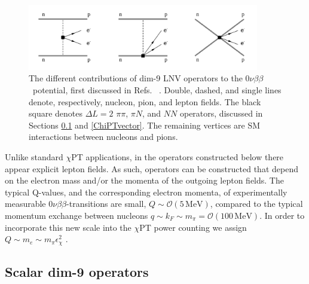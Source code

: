 \documentclass[letterpaper,11pt]{article}
\newcommand{\NLDBD}{$0 \nu \beta \beta$}
\begin{document}
\begin{figure}
\includegraphics[width=0.9\textwidth]{DoubleBeta3.pdf}
\caption{The different contributions of dim-9 LNV operators to the \NLDBD\  potential, first discussed in   Refs.\ \cite{Pontecorvo:1968wp, Vergados:1981bm,Faessler:1996ph} \cite{Prezeau:2003xn}.
Double, dashed, and single lines denote, respectively, nucleon, pion, and lepton fields. The black square denotes $\Delta L=2$ $\pi\pi$, $\pi N$, and $N\!N$ operators, discussed in Sections
\ref{ChiPTscalar} and \ref{ChiPTvector}. The remaining vertices
are SM interactions between nucleons and pions.}\label{feyndiag}
\end{figure}


Unlike standard $\chi$PT applications, in the operators constructed below there appear explicit lepton fields. As such, operators can be constructed that depend on the electron mass and/or the momenta of the outgoing lepton fields. The typical Q-values, and the corresponding electron momenta, of experimentally measurable $0\nu\beta\beta$-transitions are small, $Q\sim\mathcal O(5\,\mathrm{MeV})$, compared to the typical momentum exchange between nucleons $q \sim k_F \sim m_\pi = \mathcal O(100\,\mathrm{MeV})$. In order to incorporate this new scale into the $\chi$PT power counting we assign $Q\sim m_e \sim m_\pi \epsilon_\chi^2$ \cite{Cirigliano:2017djv}.

\subsection{Scalar dim-9 operators}\label{ChiPTscalar}
\end{document}
